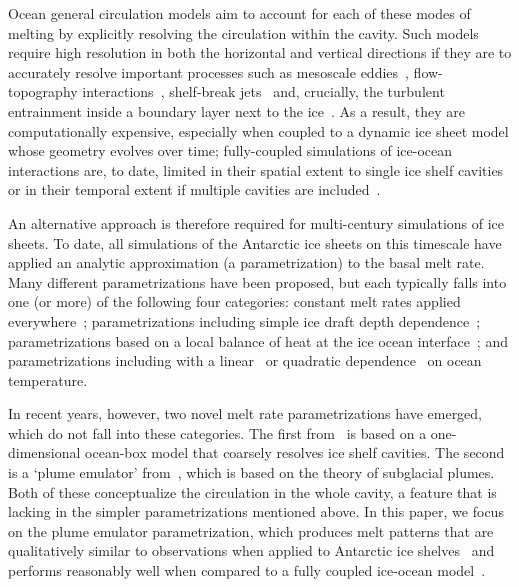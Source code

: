 \documentclass[openacc]{rsproca_new}%
\begin{document}
Ocean general circulation models aim to account for each of these modes of melting by explicitly resolving the circulation within the cavity. Such models require high resolution in both the horizontal and vertical directions if they are to accurately resolve important processes such as mesoscale eddies~\citep{Stewart2015GRL}, flow-topography interactions~\citep{Nakayama2014OceanModelling}, shelf-break jets~\citep{Graham2016JGeophysResOceans} and, crucially, the turbulent entrainment inside a boundary layer next to the ice~\citep{Kimura2014JPhysOcean, Xu2012AnnGlac}. As a result, they are computationally expensive, especially when coupled to a dynamic ice sheet model whose geometry evolves over time; fully-coupled simulations of ice-ocean interactions are, to date, limited in their spatial extent to single ice shelf cavities~\citep[e.g.][]{DeRydt2016JGeophysResEarthSurf, Seroussi2017GRL} or in their temporal extent if multiple cavities are included~\citep[e.g.][]{Mathiot2017GeosciModDev,Naughten2018JClim}.

An alternative approach is therefore required for multi-century simulations of ice sheets. To date, all simulations of the Antarctic ice sheets on this timescale have applied an analytic approximation (a parametrization) to the basal melt rate. Many different parametrizations have been proposed, but each typically falls into one (or more) of the following four categories: constant melt rates applied everywhere~\citep[e.g.][]{Arthern2017GRL}; parametrizations including simple ice draft depth dependence~\citep[e.g.][]{Joughin2014Science}; parametrizations based on a local balance of heat at the ice ocean interface~\citep[e.g][]{Golledge2015Nature}; and parametrizations including with a linear~\citep[e.g.][]{Favier2016Cryo} or quadratic dependence~\citep[e.g.][]{Holland2008JClimate,DeConto2016Nature} on ocean temperature.

In recent years, however, two novel melt rate parametrizations have emerged, which do not fall into these categories. The first from~\cite{Reese2018Cryo} is based on a one-dimensional ocean-box model that coarsely resolves ice shelf cavities. The second is a `plume emulator' from~\cite{Lazeroms2018TheCryo}, which is based on the theory of subglacial plumes. Both of these conceptualize the circulation in the whole cavity, a feature that is lacking in the simpler parametrizations mentioned above. In this paper, we focus on the plume emulator parametrization, which produces melt patterns that are qualitatively similar to observations when applied to Antarctic ice shelves~\citep{Lazeroms2018TheCryo} and performs reasonably well when compared to a fully coupled ice-ocean model~\citep{Favier2019GeosciModDev}.
\end{document}
